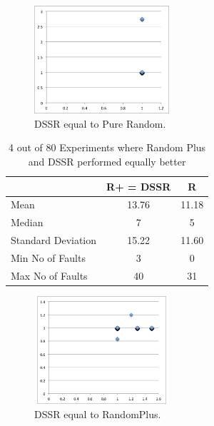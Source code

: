 \documentclass[conference]{IEEEtran}
\begin{document}
\begin{figure}[H]
\centering
\includegraphics[width=5cm,height=4cm]{DSSRequaltoPureRandom5.png}
\caption{DSSR equal to Pure Random.}
\label{fig:DSSRequaltoRandom}
\end{figure}


\begin{table}[H]
\caption{4 out of 80 Experiments where Random Plus and DSSR performed equally better}
\centering
\begin{tabular}{|l|c|c|}
\hline\hline
 				& R+ = DSSR			&  R \\[1ex]
\hline
Mean  			&    13.76				&  11.18\\
Median 			&    7 				&  5\\
Standard Deviation 	&    15.22				&  11.60\\
Min No of Faults	&    3					&  0\\
Max No of Faults 	&    40				&  31\\
\hline
\end{tabular}
\label{table:DSSRequaltoRandomPlus}
\end{table}

\begin{figure}[ht]
\centering
\includegraphics[width=5cm,height=4cm]{DSSRequaltoRandomPlus5.png}
\caption{DSSR equal to RandomPlus.}
\label{fig:DSSRequaltoRandomPlus}
\end{figure}


%
%
\end{document}
